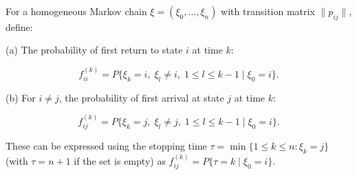 For a homogeneous Markov chain $\xi = (\xi_0, \ldots, \xi_n)$ with transition matrix $\|p_{ij}\|$, define:

(a) The probability of first return to state $i$ at time $k$:

$$f_{ii}^{(k)} = P\{\xi_k = i, \; \xi_l \neq i, \; 1 \leq l \leq k-1 \mid \xi_0 = i\}.$$

(b) For $i \neq j$, the probability of first arrival at state $j$ at time $k$:

$$f_{ij}^{(k)} = P\{\xi_k = j, \; \xi_l \neq j, \; 1 \leq l \leq k-1 \mid \xi_0 = i\}.$$

These can be expressed using the stopping time $\tau = \min\{1 \leq k \leq n : \xi_k = j\}$ (with $\tau = n+1$ if the set is empty) as $f_{ij}^{(k)} = P\{\tau = k \mid \xi_0 = i\}$.
